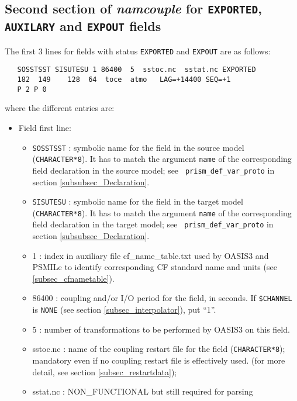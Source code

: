 \subsection{Second section of {\it namcouple} for {\tt EXPORTED}, {\tt
      AUXILARY} and {\tt EXPOUT} fields}
\label{subsubsec_secondEXPORTED}

  The first 3 lines for fields with status {\tt EXPORTED} and 
  {\tt EXPOUT} are as follows:
  \begin{verbatim}
   SOSSTSST SISUTESU 1 86400  5  sstoc.nc  sstat.nc EXPORTED
   182  149    128  64  toce  atmo   LAG=+14400 SEQ=+1
   P 2 P 0 
  \end{verbatim}
  where the different entries are:
    \begin{itemize}
      \item Field first line:
        \begin{itemize}
        \item {\tt SOSSTSST} : symbolic name for the field in the
              source model ({\tt CHARACTER*8}). It has to match the
              argument {\tt name} of the corresponding field
              declaration in the source model; see {\tt
              prism\_def\_var\_proto} in section
              \ref{subsubsec_Declaration}.
        \item {\tt SISUTESU} : symbolic name for the field in the
              target model ({\tt CHARACTER*8}).  It has to match the
              argument {\tt name} of the corresponding field
              declaration in the target model; see {\tt
              prism\_def\_var\_proto} in section
              \ref{subsubsec_Declaration}.
        \item 1 : index in auxiliary file cf\_name\_table.txt used by OASIS3 and PSMILe to identify corresponding CF standard name and units (see \ref{subsec_cfnametable}).
        \item 86400 : coupling and/or I/O period for the field, in
        seconds. If {\tt \$CHANNEL} is {\tt NONE} (see section
\ref{subsec_interpolator}), put ``1''.
        \item 5 : number of transformations to be performed by OASIS3 on this field.  
        \item sstoc.nc : name of the coupling restart file for the
          field ({\tt CHARACTER*8}); 
          mandatory even if no coupling restart file is effectively
          used. (for more detail, see section \ref{subsec_restartdata});
        \item sstat.nc : NON\_FUNCTIONAL but still required for parsing

\end{itemize}
\end{itemize}
